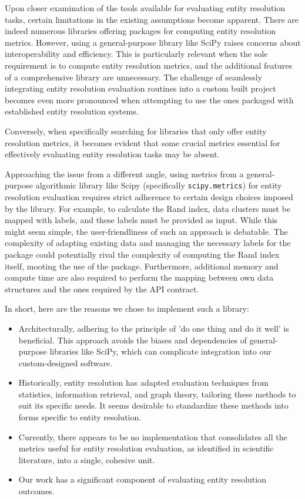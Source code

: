 \documentclass[11pt]{article}
\begin{document}
    Upon closer examination of the tools available for evaluating entity
    resolution tasks, certain limitations in the existing assumptions become
    apparent.
    There are indeed numerous libraries offering packages for computing entity
    resolution metrics.
    However, using a general-purpose library like SciPy raises concerns about
    interoperability and efficiency.
    This is particularly relevant when the sole requirement is to compute entity
    resolution metrics, and the additional features of a comprehensive library
    are unnecessary.
    The challenge of seamlessly integrating entity resolution evaluation
    routines into a custom built project becomes even more pronounced when
    attempting to use the ones packaged with established entity resolution
    systems\cite{oyster2012,jedai2017,deepm2020,magellan2020}.
    
    Conversely, when specifically searching for libraries that only offer entity
    resolution metrics, it becomes evident that some crucial metrics essential
    for effectively evaluating entity resolution tasks may be absent\cite{ereval}.

    Approaching the issue from a different angle, using metrics from a
    general-purpose algorithmic library like Scipy (specifically
    \texttt{scipy.metrics}) for entity resolution evaluation requires strict
    adherence to certain design choices imposed by the library.
    For example, to calculate the Rand index, data clusters must be mapped with
    labels, and these labels must be provided as input.
    While this might seem simple, the user-friendliness of such an approach is
    debatable.
    The complexity of adapting existing data and managing the necessary labels
    for the package could potentially rival the complexity of computing the Rand
    index itself, mooting the use of the package.
    Furthermore, additional memory and compute time are also required to perform
    the mapping between own data structures and the ones required by the API
    contract.

    In short, here are the reasons we chose to implement such a library:
    \begin{itemize}
    \item Architecturally, adhering to the principle of 'do one thing and do
    it well' is beneficial.
    This approach avoids the biases and dependencies of general-purpose
    libraries like SciPy, which can complicate integration into our
    custom-designed software.
    \item Historically, entity resolution has adapted evaluation techniques from
    statistics, information retrieval, and graph theory, tailoring these methods
    to suit its specific needs.
    It seems desirable to standardize these methods into forms specific to
    entity resolution.
    \item Currently, there appears to be no implementation that consolidates all
    the metrics useful for entity resolution evaluation, as identified in
    scientific literature, into a single, cohesive unit.
    \item Our work has a significant component of evaluating entity resolution
    outcomes.
    \end{itemize}
\end{document}
